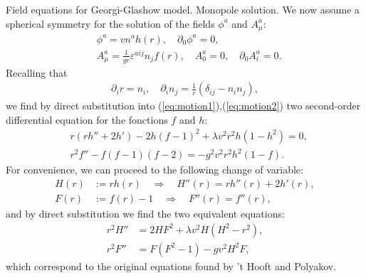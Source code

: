\begin{section}{Field equations for Georgi-Glashow model. Monopole solution.}
We now assume a spherical symmetry for the solution of the fields
$\phi^a$ and $A_{\mu}^a$:
\begin{equation}
  \begin{aligned}
    &\phi^a = v n^ah(r),\quad\partial_0\phi^a = 0,\\
    &A_\mu^a = \frac{1}{gr}\varepsilon^{aij}n_jf(r),\quad A_0^a = 0,\quad \partial_0A_i^a = 0.
  \end{aligned}\label{eq:ansatz}  
\end{equation}
Recalling that
\begin{align}
  \partial_i r = n_i, \quad \partial_i n_j = \frac{1}{r}\left(\delta_{ij}-n_in_j\right),
\end{align}
we find by direct substitution into
(\ref{eq:motion1}),(\ref{eq:motion2}) two second-order differential
equation for the fonctions $f$ and $h$:
\begin{align}
  &r(rh''+2h')-2h(f-1)^2+\lambda v^2r^2h(1-h^2) = 0,\label{eq:monopole1}\\
  &r^2f''-f(f-1)(f-2) = -g^2v^2r^2h^2(1-f).\label{eq:monopole2}
\end{align}
For convenience, we can proceed to the following change of variable:
\begin{align}
  H(r) &:= rh(r)\quad\Rightarrow\quad H''(r) = rh''(r)+2h'(r),\\
  F(r) &:= f(r)-1\quad\Rightarrow\quad F''(r) = f''(r),
\end{align}
and by direct substitution we find the two equivalent equations:
\begin{align}
  r^2H'' &= 2HF^2+\lambda v^2H(H^2-r^2),\\
  r^2F'' &= F(F^2-1)-gv^2H^2 F,
\end{align}
which correspond to the original equations found by 't Hooft and
Polyakov.


\end{section}
